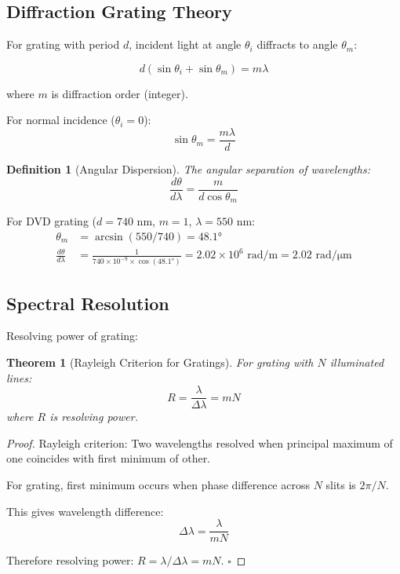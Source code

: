 \documentclass[12pt,a4paper]{article}
\newtheorem{theorem}{Theorem}
\newtheorem{definition}{Definition}
\begin{document}
\subsection{Diffraction Grating Theory}

For grating with period $d$, incident light at angle $\theta_i$ diffracts to angle $\theta_m$:

\begin{equation}
d(\sin\theta_i + \sin\theta_m) = m\lambda
\end{equation}

where $m$ is diffraction order (integer).

For normal incidence ($\theta_i = 0$):
\begin{equation}
\sin\theta_m = \frac{m\lambda}{d}
\end{equation}

\begin{definition}[Angular Dispersion]
The angular separation of wavelengths:
\begin{equation}
\frac{d\theta}{d\lambda} = \frac{m}{d\cos\theta_m}
\end{equation}
\end{definition}

For DVD grating ($d = 740$ nm, $m = 1$, $\lambda = 550$ nm:
\begin{align}
\theta_m &= \arcsin(550/740) = 48.1° \\
\frac{d\theta}{d\lambda} &= \frac{1}{740 \times 10^{-9} \times \cos(48.1°)} = 2.02 \times 10^6 \text{ rad/m} = 2.02 \text{ rad/μm}
\end{align}

\subsection{Spectral Resolution}

Resolving power of grating:

\begin{theorem}[Rayleigh Criterion for Gratings]
For grating with $N$ illuminated lines:
\begin{equation}
R = \frac{\lambda}{\Delta\lambda} = mN
\end{equation}
where $R$ is resolving power.
\end{theorem}

\begin{proof}
Rayleigh criterion: Two wavelengths resolved when principal maximum of one coincides with first minimum of other.

For grating, first minimum occurs when phase difference across $N$ slits is $2\pi/N$.

This gives wavelength difference:
\begin{equation}
\Delta\lambda = \frac{\lambda}{mN}
\end{equation}

Therefore resolving power: $R = \lambda / \Delta\lambda = mN$. $\square$
\end{proof}
\end{document}

